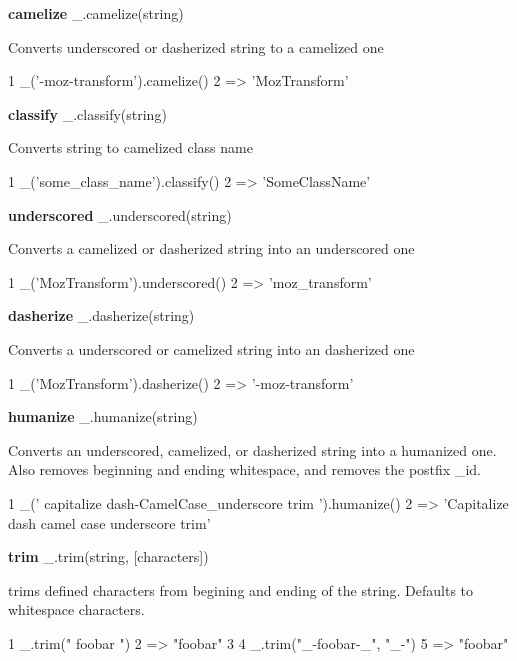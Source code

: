 {\bfseries camelize} \+\_\+.\+camelize(string)

Converts underscored or dasherized string to a camelized one


\begin{DoxyCode}
1 \_('-moz-transform').camelize()
2 => 'MozTransform'
\end{DoxyCode}


{\bfseries classify} \+\_\+.\+classify(string)

Converts string to camelized class name


\begin{DoxyCode}
1 \_('some\_class\_name').classify()
2 => 'SomeClassName'
\end{DoxyCode}


{\bfseries underscored} \+\_\+.\+underscored(string)

Converts a camelized or dasherized string into an underscored one


\begin{DoxyCode}
1 \_('MozTransform').underscored()
2 => 'moz\_transform'
\end{DoxyCode}


{\bfseries dasherize} \+\_\+.\+dasherize(string)

Converts a underscored or camelized string into an dasherized one


\begin{DoxyCode}
1 \_('MozTransform').dasherize()
2 => '-moz-transform'
\end{DoxyCode}


{\bfseries humanize} \+\_\+.\+humanize(string)

Converts an underscored, camelized, or dasherized string into a humanized one. Also removes beginning and ending whitespace, and removes the postfix \textquotesingle{}\+\_\+id\textquotesingle{}.


\begin{DoxyCode}
1 \_('  capitalize dash-CamelCase\_underscore trim  ').humanize()
2 => 'Capitalize dash camel case underscore trim'
\end{DoxyCode}


{\bfseries trim} \+\_\+.\+trim(string, \mbox{[}characters\mbox{]})

trims defined characters from begining and ending of the string. Defaults to whitespace characters.


\begin{DoxyCode}
1 \_.trim("  foobar   ")
2 => "foobar"
3 
4 \_.trim("\_-foobar-\_", "\_-")
5 => "foobar"
\end{DoxyCode}


